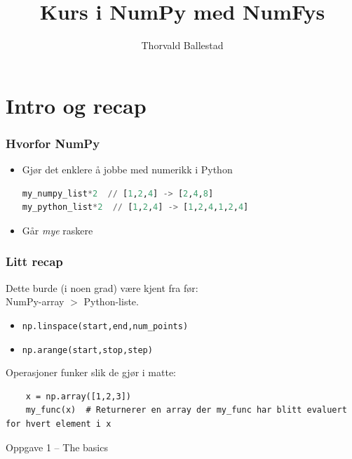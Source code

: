 \documentclass{beamer}
\title{Kurs i NumPy med NumFys}
\author{Thorvald Ballestad}
\begin{document}
\frame{\titlepage}

\frame{\tableofcontents}
\section{Intro og recap}

\begin{frame}[containsverbatim]
	\frametitle{Hvorfor NumPy}
	\begin{itemize}
		\item Gjør det enklere å jobbe med numerikk i Python
			\begin{lstlisting}[language=python]
my_numpy_list*2  // [1,2,4] -> [2,4,8]
my_python_list*2  // [1,2,4] -> [1,2,4,1,2,4]
			\end{lstlisting}
		\item Går \emph{mye} raskere
	\end{itemize}
\end{frame}

\begin{frame}[fragile]
  \frametitle{Litt recap}
  Dette burde (i noen grad) være kjent fra før:\\

  NumPy-array $>$ Python-liste.
  \begin{itemize}
  \item \lstinline{np.linspace(start,end,num_points)}
  \item \lstinline{np.arange(start,stop,step)}
  \end{itemize}

  Operasjoner funker slik de gjør i matte:
  \begin{lstlisting}
    x = np.array([1,2,3])
    my_func(x)  # Returnerer en array der my_func har blitt evaluert for hvert element i x
  \end{lstlisting}
\end{frame}

\begin{frame}
  \begin{block}{Oppgave 1 -- The basics}\end{block}
\end{frame}
\end{document}
